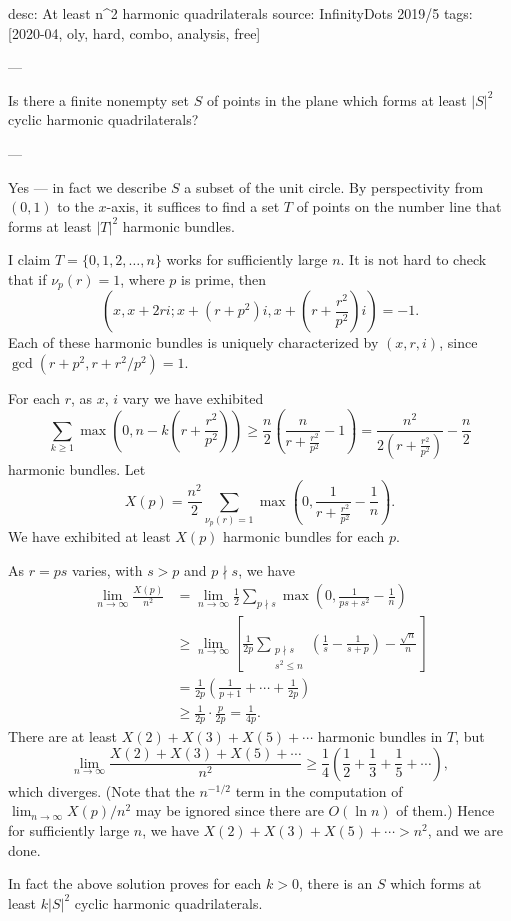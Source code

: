 desc: At least n^2 harmonic quadrilaterals
source: InfinityDots 2019/5
tags: [2020-04, oly, hard, combo, analysis, free]

---

Is there a finite nonempty set $S$ of points in the plane which forms at least $|S|^2$ cyclic harmonic quadrilaterals?

---

Yes --- in fact we describe $S$ a subset of the unit circle. By perspectivity from $(0,1)$ to the $x$-axis, it suffices to find a set $T$ of points on the number line that forms at least $|T|^2$ harmonic bundles.

I claim $T=\{0,1,2,\ldots,n\}$ works for sufficiently large $n$. It is not hard to check that if $\nu_p(r)=1$, where $p$ is prime, then \[\left(x,x+2ri;x+\left(r+p^2\right)i,x+\left(r+\frac{r^2}{p^2}\right)i\right)=-1.\]
Each of these harmonic bundles is uniquely characterized by $(x,r,i)$, since $\gcd\left(r+p^2,r+r^2/p^2\right)=1$.

For each $r$, as $x$, $i$ vary we have exhibited \[\sum_{k\ge1}\max\left(0,n-k\left(r+\frac{r^2}{p^2}\right)\right)\ge\frac n2\left(\frac n{r+\frac{r^2}{p^2}}-1\right)=\frac{n^2}{2\left(r+\frac{r^2}{p^2}\right)}-\frac n2\]
harmonic bundles. Let \[X(p)=\frac{n^2}2\sum_{\nu_p(r)=1}\max\left(0,\frac1{r+\frac{r^2}{p^2}}-\frac1n\right).\]
We have exhibited at least $X(p)$ harmonic bundles for each $p$.

As $r=ps$ varies, with $s>p$ and $p\nmid s$, we have
\begin{align*}
    \lim_{n\to\infty}\frac{X(p)}{n^2}&=\lim_{n\to\infty}\frac12\sum_{p\nmid s}\max\left(0,\frac1{ps+s^2}-\frac1n\right)\\
    &\ge\lim_{n\to\infty}\left[\frac1{2p}\sum_{\substack{p\nmid s\\ s^2\le n}}\left(\frac1s-\frac1{s+p}\right)-\frac{\sqrt n}n\right]\\
    &=\frac1{2p}\left(\frac1{p+1}+\cdots+\frac1{2p}\right)\\
    &\ge\frac1{2p}\cdot\frac p{2p}=\frac1{4p}.
\end{align*}
There are at least $X(2)+X(3)+X(5)+\cdots$ harmonic bundles in $T$, but \[\lim_{n\to\infty}\frac{X(2)+X(3)+X(5)+\cdots}{n^2}\ge\frac14\left(\frac12+\frac13+\frac15+\cdots\right),\]
which diverges. (Note that the $n^{-1/2}$ term in the computation of $\lim_{n\to\infty}X(p)/n^2$ may be ignored since there are $O(\ln n)$ of them.) Hence for sufficiently large $n$, we have $X(2)+X(3)+X(5)+\cdots>n^2$, and we are done.
\begin{remark}
    In fact the above solution proves for each $k>0$, there is an $S$ which forms at least $k|S|^2$ cyclic harmonic quadrilaterals.
\end{remark}
